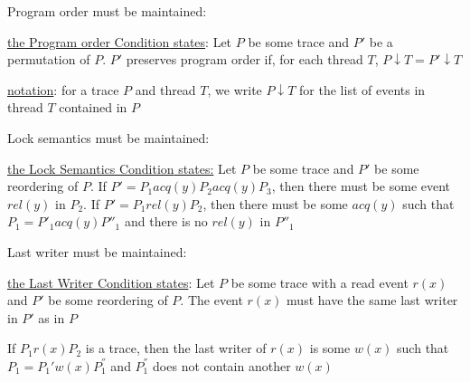 \documentclass[landscape, a4paper]{article}
\begin{document}
\begin{minipage}[t]{0.2\linewidth}
\begin{betterlist}
\begin{betterlist}
			\item \alert{Program order must be maintained}:
			\begin{betterlist}
				\item \underline{the \alert{Program order Condition} states}: Let $P$ be some trace and $P'$ be a permutation of $P$. $P'$ preserves program order if, for each thread $T$, $P \downarrow T = P' \downarrow T$
				\begin{betterlist}
					\item \underline{notation}: for a trace $P$ and thread $T$, we write $P \downarrow T$ for the list of events in thread $T$ contained in $P$
				\end{betterlist}
				\item {}
			\end{betterlist}
			\item \alert{Lock semantics must be maintained}:
			\begin{betterlist}
				\item \underline{the \alert{Lock Semantics Condition} states:} Let $P$ be some trace and $P'$ be some reordering of $P$. If $𝑃' = P_1 acq(y) P_2 acq(y) P_3$, then there must be some event $rel(y)$ in $P_2$. If $P' = P_1 rel(y) P_2$, then there must be some $acq(y)$ such that $P_1 = P'_1 acq(y) P''_1$ and there is no $rel(y)$ in $𝑃''_1$
				\item \script{87}{Example}
			\end{betterlist}
			\item \alert{Last writer must be maintained}:
			\begin{betterlist}
				\item \underline{the \alert{Last Writer Condition} states}: Let $P$ be some trace with a read event $r(x)$ and $P'$ be some reordering of $P$. The event $r(x)$ must have the same \alert{last writer} in $P'$ as in $P$
				\begin{betterlist}
					\item If $P_1 r(𝑥) P_2$ is a trace, then the \alert{last writer} of $r(x)$ is some $w(x)$ such that $P_1 = P_1' w(x) P_1^{''}$ and $P_1^{''}$ does not contain another $w(x)$
				\end{betterlist}


\end{betterlist}
\end{betterlist}
\end{betterlist}
\end{minipage}
\end{document}
